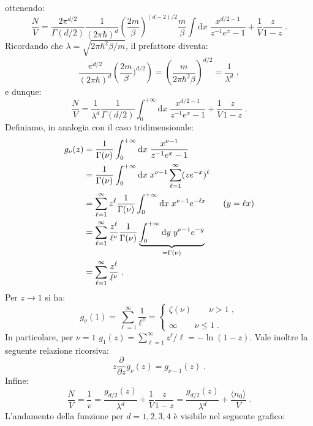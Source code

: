 \documentclass[10pt,a4paper]{report}
\theoremstyle{definition}
\numberwithin{equation}{section}
\newcommand{\diff}[1][]{\mathrm{d}#1}
\newcommand{\bra}{\langle}
\newcommand{\ket}{\rangle}
\begin{document}
ottenendo:
$$
\frac{N}{V}=\frac{2\pi^{d/2}}{\Gamma(d/2)}\frac{1}{(2\pi\hbar)^d}\left(\frac{2m}{\beta}\right)^{(d-2)/2}\frac{m}{\beta}\int\diff{x}\;\frac{x^{d/2-1}}{z^{-1}e^x-1}+\frac{1}{V}\frac{z}{1-z}\;.
$$
Ricordando che $\lambda=\sqrt{2\pi\hbar^2\beta/m}$, il prefattore diventa:
$$
\frac{\pi^{d/2}}{(2\pi\hbar)^d}\left(\frac{2m}{\beta})^{d/2}\right)=\left(\frac{m}{2\pi\hbar^2\beta}\right)^{d/2}=\frac{1}{\lambda^d}\;,
$$
e dunque:
$$
\frac{N}{V}=\frac{1}{\lambda^d}\frac{1}{\Gamma(d/2)}\int_0^{+\infty}\diff{x}\;\frac{x^{d/2-1}}{z^{-1}e^x-1}+\frac{1}{V}\frac{z}{1-z}\;.
$$
Definiamo, in analogia con il caso tridimensionale:
\begin{align}
g_{\nu}(z) &= \frac{1}{\Gamma(\nu)}\int_0^{+\infty}\diff{x}\;\frac{x^{\nu-1}}{z^{-1}e^x-1} \\
&= \frac{1}{\Gamma(\nu)}\int_0^{+\infty}\diff{x}\;x^{\nu-1}\sum_{\ell=1}^{\infty}(ze^{-x})^{\ell} \notag \\
&= \sum_{\ell=1}^{\infty}z^{\ell}\frac{1}{\Gamma(\nu)}\int_0^{+\infty}\diff{x}\;x^{\nu-1}e^{-\ell x} \qquad (y=\ell x) \notag \\
&=\sum_{\ell=1}^{\infty}\frac{z^{\ell}}{\ell^{\nu}}\frac{1}{\Gamma(\nu)}\underbrace{\int_0^{+\infty}\diff{y}\;y^{\nu-1}e^{-y}}_{=\Gamma(\nu)} \notag \\
&= \sum_{\ell=1}^{\infty}\frac{z^{\ell}}{\ell^{\nu}}\;.
\end{align}
Per $z\to 1$ si ha:
\begin{equation}
g_{\nu}(1)=\sum_{\ell=1}^{\infty}\frac{1}{\ell^{\nu}}=\begin{cases}
\zeta(\nu)\qquad \nu>1\;, \\
\\
\infty \qquad \nu\le 1\;.
\end{cases}
\end{equation}
In particolare, per $\nu=1$ $g_1(z)=\sum_{\ell=1}^{\infty}z^{\ell}/\ell=-\ln(1-z)$. Vale inoltre la seguente relazione ricorsiva:
\begin{equation}
z\frac{\partial}{\partial z}g_{\nu}(z)=g_{\nu-1}(z)\;.
\end{equation}
Infine:
\begin{equation}
\frac{N}{V}=\frac{1}{v}=\frac{g_{d/2}(z)}{\lambda^d}+\frac{1}{V}\frac{z}{1-z}=\frac{g_{d/2}(z)}{\lambda^d}+\frac{\bra n_0\ket}{V}\;.
\end{equation}
L'andamento della funzione per $d=1,2,3,4$ è visibile nel seguente grafico:
\end{document}
